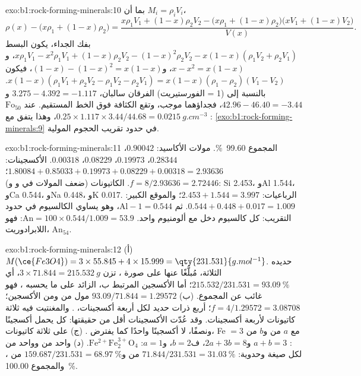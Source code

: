 \begin{solution}{exo:b1:rock-forming-minerals:10}
بما أن $M_i = \rho_i V_i$،
\[
  \rho(x) - \bigl(x\rho_1 + (1 - x)\rho_2\bigr)
  = \frac{x\rho_1V_1 + (1 - x)\rho_2V_2 - \bigl(x\rho_1 + (1 - x)\rho_2\bigr)\bigl(xV_1 + (1 - x)V_2\bigr)}{V(x)} .
\]
بفك الجداء، يكون البسط $x\rho_1V_1 - x^2\rho_1V_1 +
(1 - x)\rho_2V_2 - (1 - x)^2\rho_2V_2 - x(1 - x)(\rho_1V_2 + \rho_2V_1)$، و
$x - x^2 = x(1 - x)$، و$(1 - x) - (1 - x)^2 = x(1 - x)$، فيكون
$x(1 - x)(\rho_1V_1 + \rho_2V_2 - \rho_1V_2 - \rho_2V_1) =
x(1 - x)(\rho_1 - \rho_2)(V_1 - V_2)$. بالنسبة إلى  (1 = الفورستيريت) الفرقان سالبان، $3.275 - 4.392 = -1.117$ و$42.96 - 46.40 =
-3.44$، فجداؤهما موجب، وتقع الكثافة فوق الخط المستقيم. عند $\text{Fo}_{50}$: $0.25\times1.117\times3.44/44.68 =
\qty{0.0215}{g.cm^{-3}}$، وهذا يتفق مع \cref{exo:b1:rock-forming-minerals:9} في حدود تقريب الحجوم المولية.
\end{solution}

\begin{solution}{exo:b1:rock-forming-minerals:11}
المجموع \qty{99.60}{\percent}. مولات الأكاسيد:  $0.90042$،
 $0.28344$،  $0.19973$،  $0.08229$،
 $0.00318$. الأكسجينات: $1.80084 + 0.85033 + 0.19973 + 0.08229 +
0.00318 = 2.93636$؛ $f = 8/2.93636 = 2.72446$. الكاتيونات (ضعف المولات في
 و و): Si \num{2.453}، وAl \num{1.544}، وCa
\num{0.544}، وNa \num{0.448}، وK \num{0.017}. الرباعيات: $2.453 + 1.544 = 3.997$؛ والموقع الكبير: $0.544 + 0.448 + 0.017 = 1.009$. ثم
$\mathrm{Al} - 1 = 0.544$، وهو يساوي الكالسيوم في حدود التقريب: كل كالسيوم دخل مع ألومنيوم واحد. $\mathrm{An} = 100\times0.544/1.009 = 53.9$: فهو اللابرادوريت، $\text{An}_{54}$.
\end{solution}

\begin{solution}{exo:b1:rock-forming-minerals:12}
(أ) $M(\ce{Fe3O4}) = 3\times55.845 + 4\times15.999 = \qty{231.531}{g.mol^{-1}}$.
حديده الثلاثة، مُبلَّغًا عنها على صورة ، تزن $3\times71.844 = \qty{215.532}{g}$،
أي $215.532/231.531 = \qty{93.09}{\percent}$؛ أما الأكسجين المرتبط ب، الزائد على ما يحسبه ، فهو غائب عن المجموع. (ب) $93.09/71.844 = 1.29572$ مول من  ومن الأكسجين؛ $f =
4/1.29572 = 3.08708$؛ أربع ذرات حديد لكل أربعة أكسجينات، . والمغنتيت فيه ثلاثة كاتيونات لأربعة أكسجينات. وقد عُدّت الأكسجينات أقل من حقيقتها: كل  يحمل أكسجينًا ونصفًا، لا أكسجينًا واحدًا كما يفترض . (ج) على ثلاثة كاتيونات، Fe $= 3$
مع $a$ من  و$b$ من : $a + b = 3$ و$2a + 3b = 8$، ف$b = 2$، و$a = 1$: $\mathrm{Fe^{2+}Fe^{3+}_2O_4}$. (د) واحد من  وواحد من  لكل صيغة وحدوية: $71.844/231.531 = \qty{31.03}{\percent}$
من  و$159.687/231.531 = \qty{68.97}{\percent}$ من ، والمجموع \qty{100.00}{\percent}.
\end{solution}

